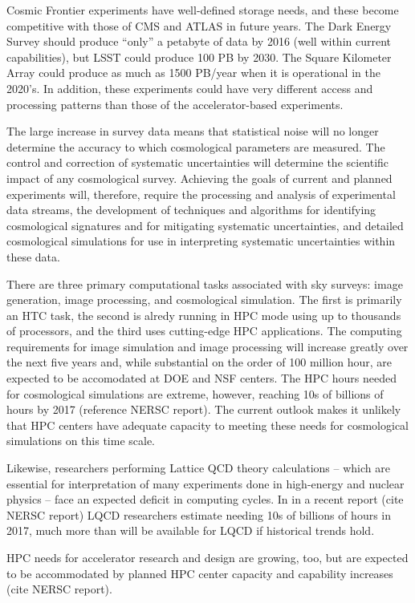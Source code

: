 Cosmic Frontier experiments have well-defined storage needs, and these become competitive with those of CMS and ATLAS in future years.  The Dark Energy Survey should produce “only” a petabyte of data by 2016 (well within current capabilities), but LSST could produce 100 PB by 2030.  The Square Kilometer Array could produce as much as 1500 PB/year when it is operational in the 2020’s.  In addition, these experiments could have very different access and processing patterns than those of the accelerator-based experiments.  

The large increase in survey data means that statistical noise will no longer determine the accuracy to which cosmological parameters are 
measured. The control and correction of systematic uncertainties will determine the scientific impact of any cosmological survey. 
Achieving the goals of current and planned experiments will, therefore, require the processing and analysis of experimental data streams, 
the development of techniques and algorithms for identifying cosmological signatures and for mitigating systematic uncertainties, 
 and detailed cosmological simulations for use in interpreting systematic uncertainties within these data. 

There are three primary computational tasks associated with sky surveys: image generation, image processing, and cosmological simulation. The first 
is primarily an HTC task, the second is alredy running in HPC mode using up to thousands of processors, and the third uses cutting-edge HPC applications.  The computing requirements for image simulation and image processing will increase greatly over the next five years and, while substantial
on the order of 100 million hour, are expected to be accomodated at DOE and NSF centers. The HPC hours needed for cosmological simulations are extreme, however, reaching 10s of billions of hours by 2017 (reference NERSC report). The current outlook
makes it unlikely that HPC centers have adequate capacity to meeting these needs for cosmological
simulations on this time scale. 
 
Likewise, researchers performing Lattice QCD theory calculations 
-- which are essential for interpretation of many experiments done in high-energy and nuclear physics -- 
face an expected deficit in computing cycles. In in a recent report (cite NERSC report) 
LQCD researchers estimate needing 10s of billions of  hours in 2017, much more than will be available 
for LQCD if historical trends hold.

HPC needs for accelerator research and design are growing, too, but are expected to be accommodated by planned HPC center capacity and capability increases (cite NERSC report). 


